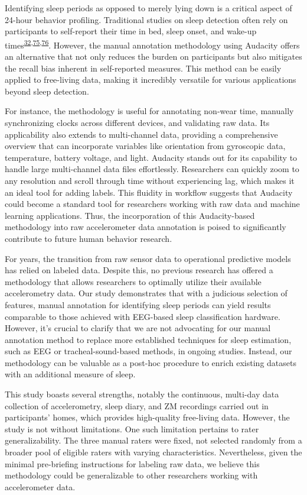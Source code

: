\documentclass[
  9pt,
]{scrbook}
\begin{document}
Identifying sleep periods as opposed to merely lying down is a critical
aspect of 24-hour behavior profiling. Traditional studies on sleep
detection often rely on participants to self-report their time in bed,
sleep onset, and wake-up
times\textsuperscript{\protect\hyperlink{ref-girschik_validation_2012}{32},\protect\hyperlink{ref-littner_2003}{75},\protect\hyperlink{ref-lockley_1999}{76}}.
However, the manual annotation methodology using Audacity offers an
alternative that not only reduces the burden on participants but also
mitigates the recall bias inherent in self-reported measures. This
method can be easily applied to free-living data, making it incredibly
versatile for various applications beyond sleep detection.

For instance, the methodology is useful for annotating non-wear time,
manually synchronizing clocks across different devices, and validating
raw data. Its applicability also extends to multi-channel data,
providing a comprehensive overview that can incorporate variables like
orientation from gyroscopic data, temperature, battery voltage, and
light. Audacity stands out for its capability to handle large
multi-channel data files effortlessly. Researchers can quickly zoom to
any resolution and scroll through time without experiencing lag, which
makes it an ideal tool for adding labels. This fluidity in workflow
suggests that Audacity could become a standard tool for researchers
working with raw data and machine learning applications. Thus, the
incorporation of this Audacity-based methodology into raw accelerometer
data annotation is poised to significantly contribute to future human
behavior research.

For years, the transition from raw sensor data to operational predictive
models has relied on labeled data. Despite this, no previous research
has offered a methodology that allows researchers to optimally utilize
their available accelerometry data. Our study demonstrates that with a
judicious selection of features, manual annotation for identifying sleep
periods can yield results comparable to those achieved with EEG-based
sleep classification hardware. However, it's crucial to clarify that we
are not advocating for our manual annotation method to replace more
established techniques for sleep estimation, such as EEG or
tracheal-sound-based methods, in ongoing studies. Instead, our
methodology can be valuable as a post-hoc procedure to enrich existing
datasets with an additional measure of sleep.

This study boasts several strengths, notably the continuous, multi-day
data collection of accelerometry, sleep diary, and ZM recordings carried
out in participants' homes, which provides high-quality free-living
data. However, the study is not without limitations. One such limitation
pertains to rater generalizability. The three manual raters were fixed,
not selected randomly from a broader pool of eligible raters with
varying characteristics. Nevertheless, given the minimal pre-briefing
instructions for labeling raw data, we believe this methodology could be
generalizable to other researchers working with accelerometer data.
\end{document}
